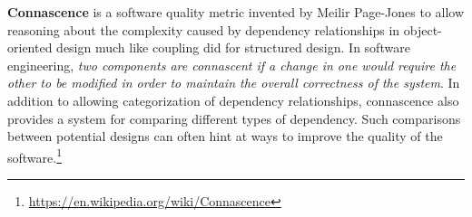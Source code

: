 \documentclass[calcdimensions,landscape,letterpaper]{powersem}
\newcommand{\thecurrentheading}{}
\newcommand{\heading}[1]{\renewcommand{\thecurrentheading}{#1}}
\begin{document}
\begin{slide}
  \heading{Connascence}
  \textbf{Connascence} \textipa{[k@"neIs@ns]} is a software quality metric invented by Meilir Page-Jones to allow reasoning about the
  complexity caused by dependency relationships in object-oriented design much like coupling did for structured design. In software
  engineering, \emph{two components are connascent if a change in one would require the other to be modified in order to maintain
  the overall correctness of the system}. In addition to allowing categorization of dependency relationships, connascence also
  provides a system for comparing different types of dependency. Such comparisons between potential designs can often hint at
  ways to improve the quality of the software.\footnote{\url{https://en.wikipedia.org/wiki/Connascence}}
\end{slide}
\end{document}
